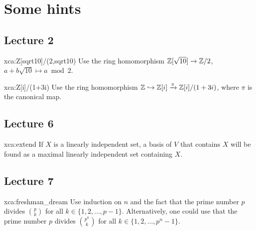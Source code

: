 \chapter*{Some hints}

\section*{Lecture 2}

\begin{sol}{xca:Z[sqrt10]/(2,sqrt10)}
	Use the ring homomorphism $\mathbb{Z}[\sqrt{10}]\to\mathbb{Z}/2$, $a+b\sqrt{10}\mapsto a\bmod 2$. 	
\end{sol}

\begin{sol}{xca:Z[i]/(1+3i)}
	Use the ring homomorphism $\mathbb{Z}\hookrightarrow\mathbb{Z}[i]\xrightarrow{\pi}\mathbb{Z}[i]/(1+3i)$, where
	$\pi$ is the canonical map. 	
\end{sol}

\section*{Lecture 6}

\begin{sol}{xca:extend}
    If $X$ is a linearly independent set, a basis 
    of $V$ that contains $X$ will be found as a maximal linearly independent set 
    containing $X$. 
\end{sol}

\section*{Lecture 7}

\begin{sol}{xca:freshman_dream}
    Use induction on $n$ and the fact that the prime number $p$ divides 
    $\binom{p}{k}$ for all $k\in\{1,2,\dots,p-1\}$. Alternatively, one could use
    that the prime number $p$ divides $\binom{p^n}{k}$ for all 
    $k\in\{1,2,\dots,p^n-1\}$. 
\end{sol}

